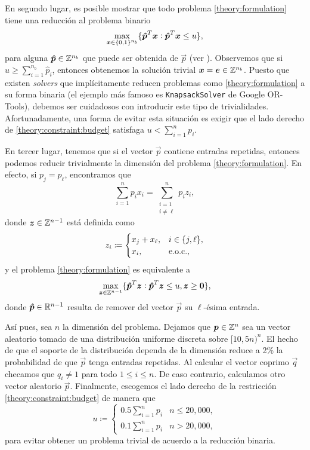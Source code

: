En segundo lugar, es posible mostrar que todo problema \eqref{theory:formulation} tiene una
reducción al problema binario
\begin{equation*}
	\max_{\boldsymbol{x} \in \lbrace 0, 1 \rbrace^{n_b}} \lbrace  \boldsymbol{\hat{p}}^T\boldsymbol{x} \vcentcolon \boldsymbol{\hat{p}}^T\boldsymbol{x} \leq
	u \rbrace,
\end{equation*}
para alguna $\boldsymbol{\hat{p}} \in \mathbb{Z}^{n_b}$ que puede ser obtenida de $\vec{p}$ (ver \cite{martello}).
Observemos que si $u \geq \sum_{i=1}^{n_b}\hat{p}_i$, entonces obtenemos la solución trivial
$\boldsymbol{x} = \boldsymbol{e} \in \mathbb{Z}^{n_b}$. Puesto que existen \textit{solvers} que implícitamente reducen
problemas como \eqref{theory:formulation} a su forma binaria (el ejemplo más famoso es
\texttt{KnapsackSolver} de Google OR-Tools), debemos ser cuidadosos con introducir este tipo de
trivialidades. Afortunadamente, una forma de evitar esta situación es exigir que el lado derecho de
\eqref{theory:constraint:budget} satisfaga $u < \sum_{i=1}^{n}p_i$.

En tercer lugar, tenemos que si el vector $\vec{p}$ contiene entradas repetidas, entonces podemos
reducir trivialmente la dimensión del problema \eqref{theory:formulation}. En efecto, si $p_j =
p_\ell$, encontramos que
\begin{equation*}
	\sum_{i = 1}^{n}p_ix_i = \sum_{\substack{i = 1 \\ i \neq \ell}}^{n}p_iz_i,
\end{equation*}
donde $\boldsymbol{z} \in \mathbb{Z}^{n-1}$ está definida como
\begin{equation*}
	z_i \coloneq \begin{cases}
		x_j + x_\ell, & i \in \lbrace j, \ell \rbrace, \\
		x_i, & \text{e.o.c.},
	\end{cases}
\end{equation*}
y el problema \eqref{theory:formulation} es equivalente a
\begin{equation*}
	\max_{\boldsymbol{z} \in \mathbb{Z}^{n-1}} \lbrace \boldsymbol{\hat{p}}^T\boldsymbol{z} \vcentcolon \boldsymbol{\hat{p}}^T\boldsymbol{z} \leq u,
	\boldsymbol{z} \geq \boldsymbol{0} \rbrace,
\end{equation*}
donde $\boldsymbol{\hat{p}} \in \mathbb{R}^{n-1}$ resulta de remover del vector $\vec{p}$ su $\ell$-ésima entrada.

Así pues, sea $n$ la dimensión del problema. Dejamos que $\boldsymbol{p} \in \mathbb{Z}^n$ sea un vector aleatorio
tomado de una distribución uniforme discreta sobre $[10, 5n)^n$. El hecho de que el soporte de la
distribución dependa de la dimensión reduce a 2\% la probabilidad de que $\vec{p}$ tenga entradas
repetidas. Al calcular el vector coprimo $\vec{q}$ checamos que $q_i \neq 1$ para todo $1 \leq i
\leq n$. De caso contrario, calculamos otro vector aleatorio $\vec{p}$. Finalmente, escogemos el
lado derecho de la restricción \eqref{theory:constraint:budget} de manera que
\begin{equation*}
	u \coloneq \begin{cases}
		0.5\sum_{i=1}^{n}p_i & n \leq 20{,}000, \\
		0.1\sum_{i=1}^{n}p_i & n > 20{,}000,
	\end{cases}
\end{equation*}
para evitar obtener un problema trivial de acuerdo a la reducción binaria.

